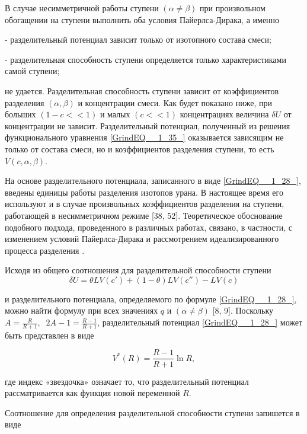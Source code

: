 В случае несимметричной работы ступени $(\alpha \ne \beta )$ при произвольном обогащении на ступени выполнить оба условия Пайерлса-Дирака, а именно

- разделительный потенциал зависит только от изотопного состава смеси;

- разделительная способность ступени определяется только характеристиками самой ступени;

не удается. Разделительная способность ступени зависит от коэффициентов разделения $(\alpha ,\beta)$ и концентрации смеси. Как будет показано ниже, при больших $(1-c<<1)$ и малых $(c<<1)$ концентрациях величина $\delta U$ от концентрации не зависит. Разделительный потенциал, полученный из решения функционального уравнения \ref{GrindEQ__1_35_} оказывается зависящим не только от состава смеси, но и коэффициентов разделения ступени, то есть $V(c,\alpha ,\beta)$.

На основе разделительного потенциала, записанного в виде \ref{GrindEQ__1_28_}, введены единицы работы разделения изотопов урана. В настоящее время его используют и в случае произвольных коэффициентов разделения на ступени, работающей в несимметричном режиме [38, 52]. Теоретическое обоснование подобного подхода, проведенного в различных работах, связано, в частности, с изменением условий Пайерлса-Дирака \cite{baranovIzotopySvoystvaPoluchenie} и рассмотрением идеализированного процесса разделения \cite{yamamotoMulticomponentIsotopeSeparating1978}.

Исходя из общего соотношения для разделительной способности ступени
\begin{equation} \label{GrindEQ__1_45_} 
\delta U=\theta LV(c')+(1-\theta )LV(c'')-LV(c) 
\end{equation} 

и разделительного потенциала, определяемого по формуле \ref{GrindEQ__1_28_}, можно найти формулу при всех значениях $q$ и $(\alpha \ne \beta )$ [8, 9]. Поскольку $A=\frac{R}{R+1} ,\; \; 2A-1=\frac{R-1}{R+1} $, разделительный потенциал \ref{GrindEQ__1_28_} может быть представлен в виде

\begin{equation} \label{GrindEQ__1_46_} 
V^{*} (R)=\frac{R-1}{R+1} \ln R,                            
\end{equation} 

где индекс «звездочка» означает то, что разделительный потенциал рассматривается как функция новой переменной $R$.

Соотношение для определения разделительной способности ступени запишется в виде

